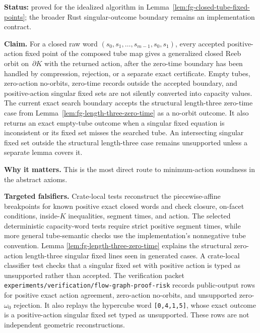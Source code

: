 \begin{unverified}
\begin{remark}%
\label{rem:fg-pr-closed-fixed-point-soundness}
\textbf{Status:} proved for the idealized algorithm in
Lemma~\ref{lem:fg-closed-tube-fixed-points}; the broader Rust singular-outcome
boundary remains an implementation contract.

\textbf{Claim.}  For a closed raw word
$(s_0,s_1,\ldots,s_{m-1},s_0,s_1)$, every accepted positive-action fixed point
of the composed tube map gives a generalized closed Reeb orbit on~$\partial K$
with the returned action, after the zero-time boundary has been handled by
compression, rejection, or a separate exact certificate.  Empty tubes,
zero-action no-orbits, zero-time records outside the accepted boundary, and
positive-action singular fixed sets are not silently converted into capacity
values.  The current exact search boundary accepts the structural
length-three zero-time case from Lemma~\ref{lem:fg-length-three-zero-time} as a
no-orbit outcome.  It also returns an exact empty-tube outcome when a singular
fixed equation is inconsistent or its fixed set misses the searched tube.  An
intersecting singular fixed set outside the structural length-three case
remains unsupported unless a separate lemma covers it.

\textbf{Why it matters.}  This is the most direct route to minimum-action
soundness in the abstract axioms.

\textbf{Targeted falsifiers.}  Crate-local tests reconstruct the
piecewise-affine breakpoints for known positive exact closed words and check
closure, on-facet conditions, inside-$K$ inequalities, segment times, and
action.  The selected deterministic capacity-word tests require strict
positive segment times, while more general tube-semantic checks use the
implementation's nonnegative tube convention.  Lemma
\ref{lem:fg-length-three-zero-time} explains the structural zero-action
length-three singular fixed lines seen in generated cases.  A crate-local
classifier test checks that a singular fixed set with positive action is typed
as unsupported rather than accepted.  The verification packet
\texttt{experiments/verification/flow-graph-proof-risk} records public-output
rows for positive exact action agreement, zero-action no-orbits, and
unsupported zero-$\omega_0$ rejection.  It also replays the hypercube word
\texttt{[0,4,1,5]}, whose exact outcome is a positive-action singular fixed
set typed as unsupported.  These rows are not independent geometric
reconstructions.
\end{remark}
\end{unverified}

